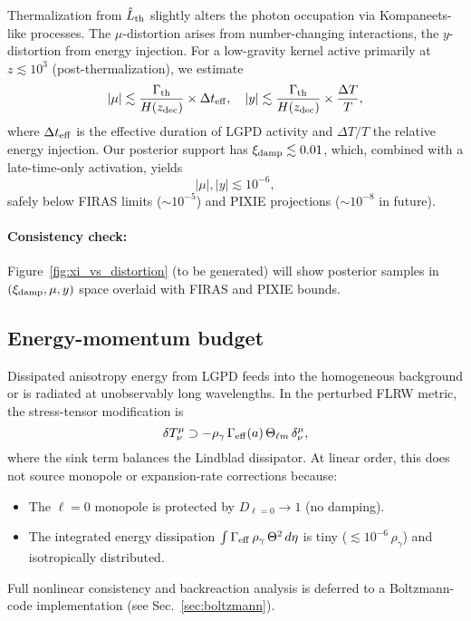 \documentclass[11pt]{article}
\begin{document}
Thermalization from $\hat{L}_{\rm th}$ slightly alters the photon occupation via Kompaneets-like processes.
The $\mu$-distortion arises from number-changing interactions, the $y$-distortion from energy injection.
For a low-gravity kernel active primarily at $z\lesssim 10^3$ (post-thermalization), we estimate
\begin{equation}
|\mu| \lesssim \frac{\Gamma_{\rm th}}{H(z_{\rm dec})} \times \Delta t_{\rm eff},
\quad
|y| \lesssim \frac{\Gamma_{\rm th}}{H(z_{\rm dec})} \times \frac{\Delta T}{T},
\end{equation}
where $\Delta t_{\rm eff}$ is the effective duration of LGPD activity and $\Delta T/T$ the relative energy injection.
Our posterior support has $\xi_{\rm damp}\lesssim 0.01$, which, combined with a late-time-only activation, yields
\begin{equation}
|\mu|, |y| \lesssim 10^{-6},
\end{equation}
safely below FIRAS limits ($\sim 10^{-5}$) and PIXIE projections ($\sim 10^{-8}$ in future).

\paragraph{Consistency check:}
Figure~\ref{fig:xi_vs_distortion} (to be generated) will show posterior samples in $(\xi_{\rm damp}, \mu, y)$ space 
overlaid with FIRAS and PIXIE bounds.

\subsection{Energy-momentum budget}

Dissipated anisotropy energy from LGPD feeds into the homogeneous background or is radiated at unobservably long wavelengths.
In the perturbed FLRW metric, the stress-tensor modification is
\begin{equation}
\delta T^\mu_\nu \supset - \rho_\gamma\,\Gamma_{\rm eff}(a)\,\Theta_{\ell m}\,\delta^\mu_\nu,
\end{equation}
where the sink term balances the Lindblad dissipator.
At linear order, this does not source monopole or expansion-rate corrections because:
\begin{itemize}
  \item The $\ell=0$ monopole is protected by $D_{\ell=0}\to 1$ (no damping).
  \item The integrated energy dissipation $\int \Gamma_{\rm eff}\,\rho_\gamma\,\Theta^2\,d\eta$ is tiny ($\lesssim 10^{-6}\,\rho_\gamma$) and isotropically distributed.
\end{itemize}
Full nonlinear consistency and backreaction analysis is deferred to a Boltzmann-code implementation (see Sec.~\ref{sec:boltzmann}).
\end{document}
